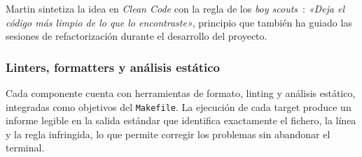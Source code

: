 Martin sintetiza la idea en \emph{Clean Code} con la regla de los \emph{boy scouts}~\cite{MartinCleanCode08}: \emph{«Deja el código más limpio de lo que lo encontraste»}, principio que también ha guiado las sesiones de refactorización durante el desarrollo del proyecto.

\subsubsection{Linters, formatters y análisis estático}

Cada componente cuenta con herramientas de formato, linting y análisis estático, integradas como objetivos del \texttt{Makefile}. La ejecución de cada target produce un informe legible en la salida estándar que identifica exactamente el fichero, la línea y la regla infringida, lo que permite corregir los problemas sin abandonar el terminal.


